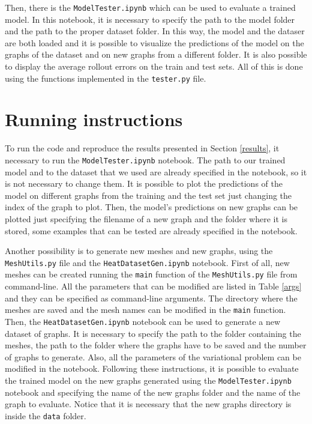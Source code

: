 \documentclass[11pt,a4paper]{article}
\begin{document}
Then, there is the \texttt{ModelTester.ipynb} which can be used to evaluate a trained model. In this notebook, it is necessary to specify the path to the model folder and the path to the proper dataset folder. In this way, the model and the dataser are both loaded and it is possible to visualize the predictions of the model on the graphs of the dataset and on new graphs from a different folder. It is also possible to display the average rollout errors on the train and test sets. All of this is done using the functions implemented in the \texttt{tester.py} file.

\section{Running instructions}

To run the code and reproduce the results presented in Section \ref{results}, it necessary to run the \texttt{ModelTester.ipynb} notebook. The path to our trained model and to the dataset that we used are already specified in the notebook, so it is not necessary to change them. It is possible to plot the predictions of the model on different graphs from the training and the test set just changing the index of the graph to plot. Then, the model's predictions on new graphs can be plotted just specifying the filename of a new graph and the folder where it is stored, some examples that can be tested are already specified in the notebook. 

Another possibility is to generate new meshes and new graphs, using the \texttt{MeshUtils.py} file and the \texttt{HeatDatasetGen.ipynb} notebook. 
First of all, new meshes can be created running the \texttt{main} function of the \texttt{MeshUtils.py} file from command-line. All the parameters that can be modified are listed in Table \ref{args} and they can be specified as command-line arguments. The directory where the meshes are saved and the mesh names can be modified in the \texttt{main} function. 
Then, the \texttt{HeatDatasetGen.ipynb} notebook can be used to generate a new dataset of graphs. It is necessary to specify the path to the folder containing the meshes, the path to the folder where the graphs have to be saved and the number of graphs to generate. Also, all the parameters of the variational problem can be modified in the notebook. 
Following these instructions, it is possible to evaluate the trained model on the new graphs generated using the \texttt{ModelTester.ipynb} notebook and specifying the name of the new graphs folder and the name of the graph to evaluate. Notice that it is necessary that the new graphs directory is inside the \texttt{data} folder.
\end{document}
